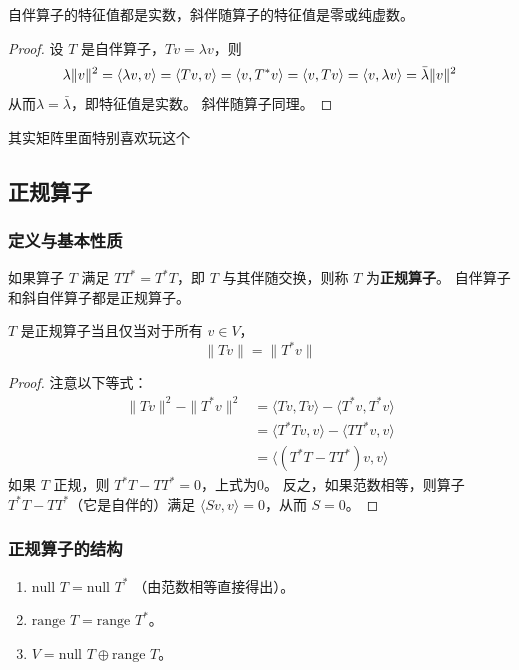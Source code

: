 \begin{theorem}
    自伴算子的特征值都是实数，斜伴随算子的特征值是零或纯虚数。
\end{theorem}
\begin{proof}
    设 \(T\) 是自伴算子，\(Tv = \lambda v\)，则
    \[
        \lambda \lVert v\rVert^{2} = \langle \lambda v,v \rangle = \langle Tv,v \rangle = \langle v, T^* v \rangle = \langle v, Tv \rangle = \langle v, \lambda v \rangle = \bar{\lambda} \lVert v\rVert^{2}
    \]
    从而\(\lambda = \bar{\lambda}\)，即特征值是实数。
    斜伴随算子同理。
\end{proof}
其实矩阵里面特别喜欢玩这个

\subsection{正规算子}

\subsubsection{定义与基本性质}
如果算子 \(T\) 满足 \(TT^* = T^*T\)，即 \(T\) 与其伴随交换，则称 \(T\) 为\textbf{正规算子}。
自伴算子和斜自伴算子都是正规算子。

\begin{theorem}
    \(T\) 是正规算子当且仅当对于所有 \(v \in V\)，
    \[
        \|Tv\| = \|T^*v\|
    \]
\end{theorem}
\begin{proof}
    注意以下等式：
    \begin{align*}
        \|Tv\|^2 - \|T^*v\|^2 &= \langle Tv, Tv \rangle - \langle
        T^*v, T^*v \rangle \\
        &= \langle T^*Tv, v \rangle - \langle TT^*v, v \rangle \\
        &= \langle (T^*T - TT^*)v, v \rangle
    \end{align*}
    如果 \(T\) 正规，则 \(T^*T - TT^* = 0\)，上式为0。
    反之，如果范数相等，则算子 \(T^*T - TT^*\)（它是自伴的）满足 \(\langle Sv, v \rangle =
    0\)，从而 \(S=0\)。
\end{proof}

\subsubsection{正规算子的结构}
\begin{theorem}
    \begin{enumerate}
        \item \(\text{null } T = \text{null } T^*\) （由范数相等直接得出）。
        \item \(\text{range } T = \text{range } T^*\)。
        \item \(V = \text{null } T \oplus \text{range } T\)。
    \end{enumerate}
\end{theorem}

